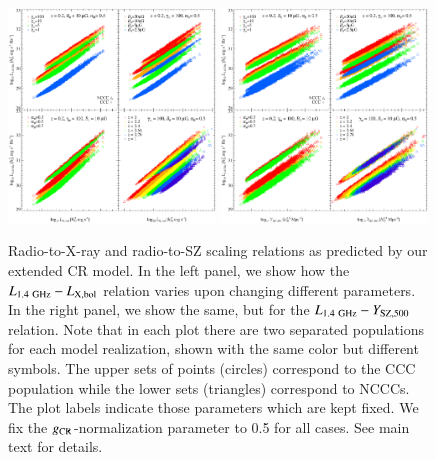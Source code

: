 \documentclass[useAMS,usenatbib]{mn2e}
\begin{document}
\begin{figure} 
\centering
\includegraphics[width=0.49\textwidth]{figures/PL_relation_testing_gimp.eps}
\includegraphics[width=0.49\textwidth]{figures/PSZ_relation_testing_gimp.eps}
\caption{Radio-to-X-ray and radio-to-SZ scaling relations as predicted by our
  extended CR model. In the left panel, we show how the
  $L_{1.4~{\mathrm{GHz}}}-L_{{\mathrm{X,bol}}}$ relation varies upon changing different
  parameters. In the right panel, we show the same, but for the
  $L_{1.4~{\mathrm{GHz}}}-Y_{{\mathrm{SZ}},500}$ relation. Note that in each plot there
  are two separated populations for each model realization, shown with the same
  color but different symbols. The upper sets of points (circles) correspond to the CCC 
  population while the lower sets (triangles) correspond to NCCCs. The plot labels indicate 
  those parameters which are kept fixed. We fix the $g_{{\mathrm{CR}}}$-normalization parameter to 0.5
  for all cases. See main text for details.}
\label{fig:SR}
\end{figure}
\end{document}
